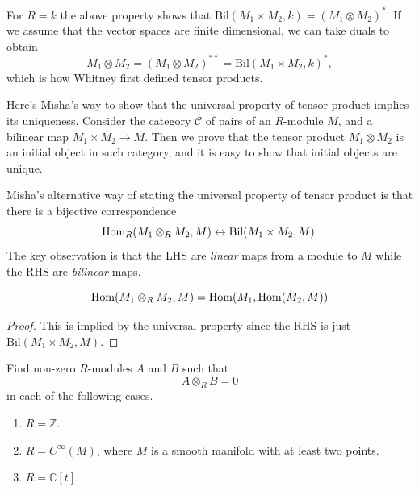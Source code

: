 \begin{remark}
\label{remark-whitneys-definition}
For $R=k$ the above property shows that
$\text{Bil}(M_1\times M_2,k)=(M_1 \otimes
M_2)^*$.
If we assume that the vector spaces are
finite dimensional,
we can take duals to obtain
$$
M_1 \otimes M_2 = (M_1 \otimes M_2)^ {*
*}=\text{Bil}(M_1 \times M_2,k)^*,
$$
which is how Whitney first defined tensor
products.
\end{remark}

\noindent
Here's Misha's way to show that the universal
property
of tensor product implies its uniqueness.
Consider the category $\mathcal{C}$ of pairs
of an $R$-module $M$,
and a bilinear map $M_1 \times M_2 \to M$.
Then we prove that the tensor product $M_1
\otimes M_2$
is an initial object in such category,
and it is easy to show that initial objects
are unique.

\begin{remark}
\label{remark-universal-property}
Misha's alternative way of stating the
universal property of tensor product is
that there is a bijective correspondence
$$
\mathop{\mathrm{Hom}}\nolimits_R(M_1 \otimes_R M_2, M)
\leftrightarrow
\text{Bil}(M_1\times M_2,M).
$$
The key observation is that the LHS are {\it
linear} maps from a module to $M$
while the RHS are {\it bilinear} maps.
\end{remark}

\begin{exercise}[Currying]
\label{exercise-currying}
$$
\mathop{\mathrm{Hom}}\nolimits(M_1\otimes_R M_2, M)
=
\mathop{\mathrm{Hom}}\nolimits(M_1,\mathop{\mathrm{Hom}}\nolimits(M_2,M))
$$
\end{exercise}

\begin{proof}
This is implied by the universal property
since the RHS is just $\text{Bil}(M_1\times
M_2,M)$.
\end{proof}

\begin{exercise}
\label{exercise-zero-tensor}
Find non-zero $R$-modules $A$ and $B$
such that
$$
A \otimes_R B=0
$$
in each of the following cases.
\begin{enumerate}
\item $R=\mathbb{Z}$.
\item $R=C^\infty(M)$, where $M$ is a
smooth manifold with at least two points.
\item $R=\mathbb{C}[t]$.
\end{enumerate}
\end{exercise}

